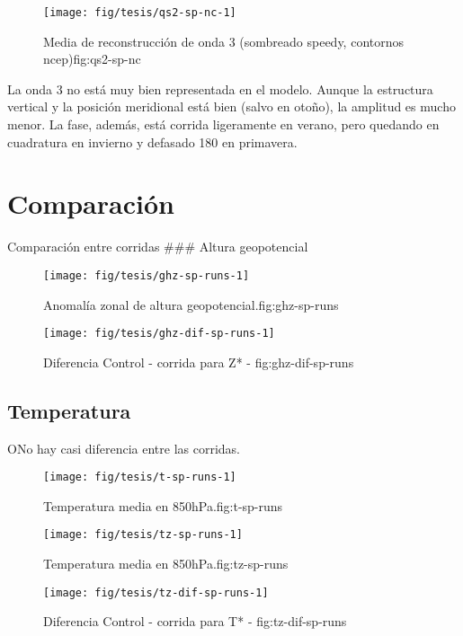 \documentclass[spanish,a4paper]{book}
\begin{document}
\begin{figure*}
\texttt{[image: fig/tesis/qs2-sp-nc-1]} \caption{Media de reconstrucción de onda 3 (sombreado speedy, contornos ncep){fig:qs2-sp-nc}}\label{fig:qs2-sp-nc}
\end{figure*}

La onda 3 no está muy bien representada en el modelo. Aunque la
estructura vertical y la posición meridional está bien (salvo en otoño),
la amplitud es mucho menor. La fase, además, está corrida ligeramente en
verano, pero quedando en cuadratura en invierno y defasado 180 en
primavera.

\section{Comparación}\label{comparacion}

Comparación entre corridas \#\#\# Altura geopotencial

\begin{figure}

{\centering \texttt{[image: fig/tesis/ghz-sp-runs-1]} 

}

\caption{Anomalía zonal de altura geopotencial.{fig:ghz-sp-runs}}\label{fig:ghz-sp-runs}
\end{figure}

\begin{figure}
\texttt{[image: fig/tesis/ghz-dif-sp-runs-1]} \caption{Diferencia Control - corrida para Z* - fig:ghz-dif-sp-runs}\label{fig:ghz-dif-sp-runs}
\end{figure}

\subsection{Temperatura}\label{temperatura-2}

ONo hay casi diferencia entre las corridas.

\begin{figure}
\texttt{[image: fig/tesis/t-sp-runs-1]} \caption{Temperatura media en 850hPa.{fig:t-sp-runs}}\label{fig:t-sp-runs}
\end{figure}

\begin{figure}
\texttt{[image: fig/tesis/tz-sp-runs-1]} \caption{Temperatura media en 850hPa.{fig:tz-sp-runs}}\label{fig:tz-sp-runs}
\end{figure}

\begin{figure}

{\centering \texttt{[image: fig/tesis/tz-dif-sp-runs-1]} 

}

\caption{Diferencia Control - corrida para T* - fig:tz-dif-sp-runs}\label{fig:tz-dif-sp-runs}
\end{figure}
\end{document}
